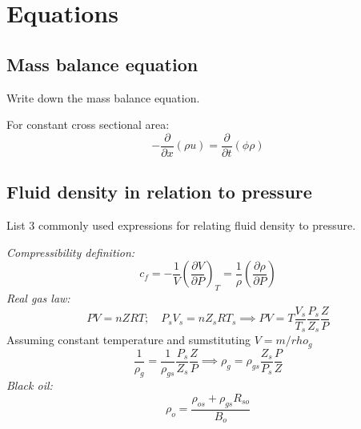 
\section{Equations} %
\label{sec:equations}

\subsection{Mass balance equation} %
\label{sub:mass_balance_equation}

\begin{question}
  Write down the mass balance equation.
\end{question}

For constant cross sectional area:
\begin{equation}
  - \frac{\partial}{\partial x} \left( \rho u \right)
  = \frac{\partial }{\partial t} \left( \phi \rho \right)
\end{equation}

\subsection{Fluid density in relation to pressure} %
\label{sub:fluid_density_in_relation_to_pressure}

\begin{question}
  List 3 commonly used expressions for relating fluid density to pressure.
\end{question}

\emph{Compressibility definition:}
\begin{equation}
  c_f = - \frac{1}{V} \left( \frac{\partial V}{\partial P} \right)_T = \frac{1}{\rho} \left( \frac{\partial  \rho}{\partial P} \right)
\end{equation}
\emph{Real gas law:}
\begin{equation}
  \nonumber
  PV = nZRT; \quad P_s V_s = n Z_s R T_s \implies PV = T \frac{V_s}{T_s} \frac{P_s}{Z_s} \frac{Z}{P}
\end{equation}
Assuming constant temperature and sumstituting $V=m/rho_g$
\begin{equation}
  \frac{1}{\rho_g} = \frac{1}{\rho_{gs}} \frac{P_s}{Z_s} \frac{Z}{P} \implies \rho_g = \rho_{gs} \frac{Z_s}{P_s} \frac{P}{Z}
\end{equation}
\emph{Black oil:}
\begin{equation}
  \rho_o = \frac{\rho_{os}+\rho_{gs}R_{so}}{B_o}
\end{equation}


